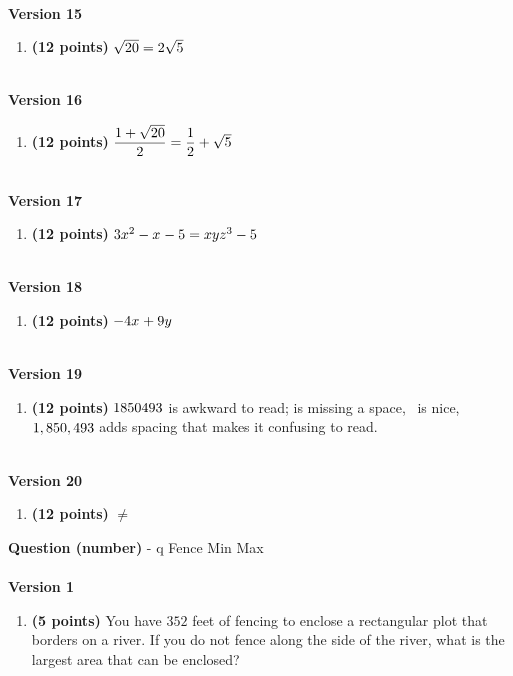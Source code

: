 \documentclass[12pt]{amsart}
\begin{document}
\begin{enumerate}[resume]
\vfill 
 \end{enumerate}$ $ \\ {\bf Version 15} \\\begin{enumerate}[resume]
\item {\bf (12 points)} 
  $\sqrt{20} = 2 \sqrt{5}$ 
\vfill 
 \end{enumerate}$ $ \\ {\bf Version 16} \\\begin{enumerate}[resume]
\item {\bf (12 points)} 
 $\dfrac{1+\sqrt{\rootfourtwo}}{2} = \dfrac{1}{2} + \ifthenelse{\wowfourtwo = 1}{}{\wowfourtwo} \sqrt{\infourtwo}$

\vfill 
 \end{enumerate}$ $ \\ {\bf Version 17} \\\begin{enumerate}[resume]
\item {\bf (12 points)} 
  $3x^{2}-x^{}-5 = xyz^{3}-5$ 
\vfill 
 \end{enumerate}$ $ \\ {\bf Version 18} \\\begin{enumerate}[resume]
\item {\bf (12 points)} 
  $-4x^{} +9y^{}$ 
\vfill 
 \end{enumerate}$ $ \\ {\bf Version 19} \\\begin{enumerate}[resume]
\item {\bf (12 points)} 
 $1850493$ is awkward to read; \nicefourfour is missing a space, \nicefourfour\ is nice, $1,850,493$ adds spacing that makes it confusing to read. 
\vfill 
 \end{enumerate}$ $ \\ {\bf Version 20} \\\begin{enumerate}[resume]
\item {\bf (12 points)} 
  \goodfourfour $\neq$ \badfourfour 
\vfill 
 \end{enumerate}\newpage\newpage\def \x{88}\def \y{176}\def \L{352}\def \area{15488}{\Large{\bf Question (number)}} - q Fence Min Max\\ $ $ \\ {\bf Version 1} \\\begin{enumerate}[resume]
\item {\bf (5 points)} 
 You have $\L$ feet of fencing to enclose a rectangular plot that borders on a river. If you do not fence along the side of the river, what is the largest area that can be enclosed? \\


\end{enumerate}
\end{document}
